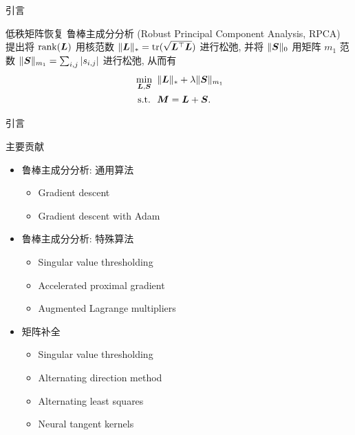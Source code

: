 \documentclass{beamer}
\begin{document}
\begin{frame}{引言}
  \begin{block}{低秩矩阵恢复}
    鲁棒主成分分析 (Robust Principal Component Analysis, RPCA) \cite{candes2011robust} 提出将 $\operatorname{rank}(\bm{L})$ 用核范数 $\|\bm{L}\|_{*}=\operatorname{tr}(\sqrt{\bm{L}^\top\bm{L}})$ 进行松弛, 并将 $\|\bm{S}\|_0$ 用矩阵 $m_1$ 范数 $\|\bm{S}\|_{m_1}=\sum_{i,j}|s_{i,j}|$ 进行松弛, 从而有
    \begin{equation}
      \label{eq:rpca}
      \begin{aligned}
        &\min_{\bm{L},\bm{S}}~\|\bm{L}\|_{*}+\lambda\|\bm{S}\|_{m_1} \\
        &~\text{s.t.}~~\bm{M}=\bm{L}+\bm{S}.
      \end{aligned}
    \end{equation}
  \end{block}
\end{frame}

\begin{frame}{引言}
  \begin{block}{主要贡献}
    \begin{itemize}
      \item 鲁棒主成分分析: 通用算法
      \begin{itemize}
        \item Gradient descent
        \item Gradient descent with Adam
      \end{itemize}
      \item 鲁棒主成分分析: 特殊算法
      \begin{itemize}
        \item Singular value thresholding
        \item Accelerated proximal gradient
        \item Augmented Lagrange multipliers
      \end{itemize}
      \item 矩阵补全
      \begin{itemize}
        \item Singular value thresholding
        \item Alternating direction method
        \item Alternating least squares
        \item Neural tangent kernels
      \end{itemize}
    \end{itemize}
  \end{block}
\end{frame}
\end{document}
